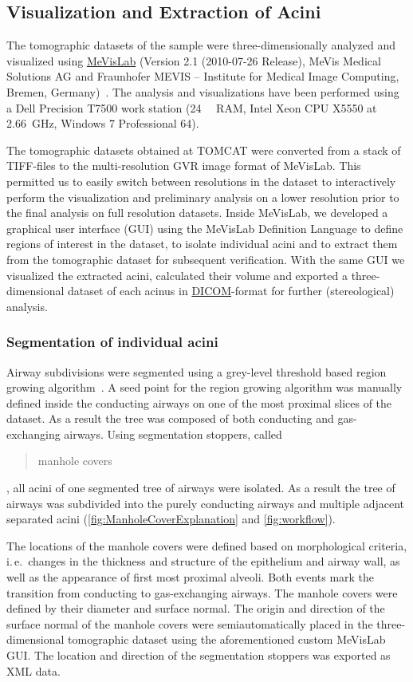 \documentclass[paper=a4,twocolumn=true,DIV=calc,abstract,english]{scrartcl}
\newcommand{\ie}{i.\,e.\ }
\begin{document}
\subsection{Visualization and Extraction of Acini}
The tomographic datasets of the sample were three-dimensionally analyzed and visualized using \href{http://mevislab.de}{MeVisLab} (Version 2.1 (2010-07-26 Release), MeVis Medical Solutions AG and Fraunhofer MEVIS -- Institute for Medical Image Computing, Bremen, Germany)~\citep{Bitter2007}.
The analysis and visualizations have been performed using a Dell Precision T7500 work station (\SI{24}{\giga\byte} RAM, Intel Xeon CPU X5550 at \SI{2.66}{\giga\hertz}, Windows 7 Professional \SI{64}{\bit}).

The tomographic datasets obtained at TOMCAT were converted from a stack of TIFF-files to the multi-resolution GVR image format of MeVisLab.
This permitted us to easily switch between resolutions in the dataset to interactively perform the visualization and preliminary analysis on a lower resolution prior to the final analysis on full resolution datasets.
Inside MeVisLab, we developed a graphical user interface (GUI) using the MeVisLab Definition Language to define regions of interest in the dataset, to isolate individual acini and to extract them from the tomographic dataset for subsequent verification.
With the same GUI we visualized the extracted acini, calculated their volume and exported a three-dimensional dataset of each acinus in \href{http://en.wikipedia.org/w/index.php?title=DICOM&oldid=511155074}{DICOM}-format for further (stereological) analysis.

\subsubsection{Segmentation of individual acini}
\label{sec:manhole covers}
Airway subdivisions were segmented using a grey-level threshold based region growing algorithm~\citep{Zucker1976}.
A seed point for the region growing algorithm was manually defined inside the conducting airways on one of the most proximal slices of the dataset.
As a result the tree was composed of both conducting and gas-exchanging airways.
Using segmentation stoppers, called \blockquote{manhole covers}, all acini of one segmented tree of airways were isolated.
As a result the tree of airways was subdivided into the purely conducting airways and multiple adjacent separated acini (\autoref{fig:ManholeCoverExplanation} and \ref{fig:workflow}).

The locations of the manhole covers were defined based on morphological criteria, \ie changes in the thickness and structure of the epithelium and airway wall, as well as the appearance of first most proximal alveoli.
Both events mark the transition from conducting to gas-exchanging airways.
The manhole covers were defined by their diameter and surface normal.
The origin and direction of the surface normal of the manhole covers were semiautomatically placed in the three-dimensional tomographic dataset using the aforementioned custom MeVisLab GUI.
The location and direction of the segmentation stoppers was exported as XML data.
\end{document}
